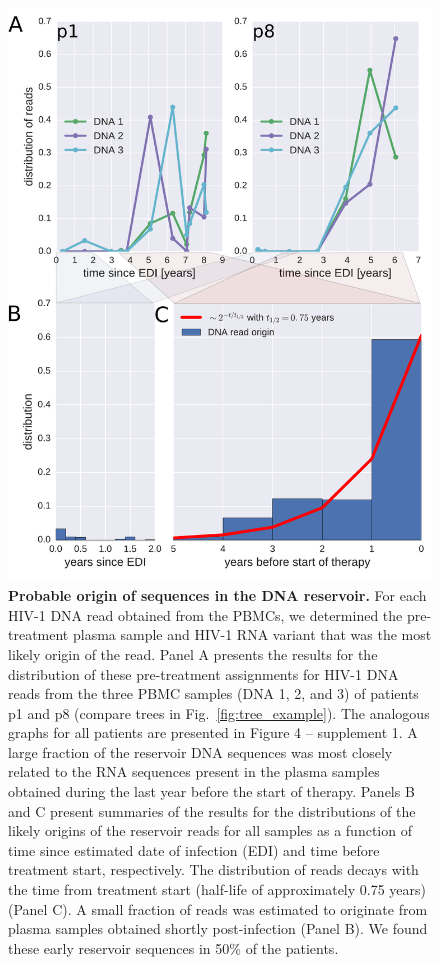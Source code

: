 \documentclass[aps,rmp,onecolumn,linenumbers]{revtex4-1}
\newcommand{\FIG}[1]{Fig.~\ref{fig:#1}}
\begin{document}
\begin{figure}[htb]
\centering
\includegraphics[width=0.7\columnwidth]{figures/fig4}
\caption{{\bf Probable origin of sequences in the DNA reservoir.} For each HIV-1 DNA read obtained from the PBMCs, we determined the pre-treatment plasma sample and HIV-1 RNA variant that was the most likely origin of the read. Panel A presents the results for the distribution of these pre-treatment assignments for HIV-1 DNA reads from the three PBMC samples (DNA 1, 2, and 3) of patients p1 and p8 (compare trees in \FIG{tree_example}). The analogous graphs for all patients are presented in Figure 4 -- supplement 1. A large fraction of the reservoir DNA sequences was most closely related to the RNA sequences present in the plasma samples obtained during the last year before the start of therapy. 
Panels B and C present summaries of the results for the distributions of the likely origins of the reservoir reads for all samples as a function of time since estimated date of infection (EDI) and time before treatment start, respectively. The distribution of reads decays with the time from treatment start (half-life of approximately 0.75 years) (Panel C). 
A small fraction of reads was estimated to originate from plasma samples obtained shortly post-infection (Panel B). We found these early reservoir sequences in 50\% of the patients.} 
\label{fig:seeding}
\end{figure}
\end{document}
